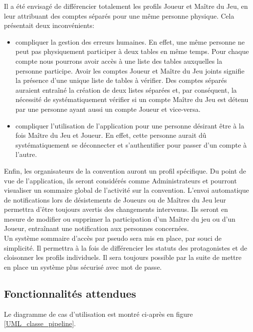 \documentclass[11pt]{article}
\begin{document}
\indent Il a été envisagé de différencier totalement les profils Joueur et Maître du Jeu, en leur attribuant des comptes séparés pour une même personne physique. Cela présentait deux inconvénients:
\begin{itemize}
\item{compliquer la gestion des erreurs humaines. En effet, une même personne ne peut pas physiquement participer à deux tables en même temps. Pour chaque compte nous pourrons avoir accès à une liste des tables auxquelles la personne participe. Avoir les comptes Joueur et Maître du Jeu joints signifie la présence d'une unique liste de tables à vérifier. Des comptes séparés auraient entraîné la création de deux listes séparées et, par conséquent, la nécessité de systématiquement vérifier si un compte Maître du Jeu est détenu par une personne ayant aussi un compte Joueur et vice-versa.}
\item{compliquer l'utilisation de l'application pour une personne désirant être à la fois Maître du Jeu et Joueur. En effet, cette personne aurait dû systématiquement se déconnecter et s'authentifier pour passer d'un compte à l'autre.\\}
\end{itemize}

Enfin, les organisateurs de la convention auront un profil spécifique. Du point de vue de l'application, ils seront considérés comme Administrateurs et pourront visualiser un sommaire global de l'activité sur la convention. L'envoi automatique de notifications lors de désistements de Joueurs ou de Maîtres du Jeu leur permettra d'être toujours avertis des changements intervenus. Ils seront en mesure de modifier ou supprimer la participation d'un Maître du jeu ou d'un Joueur, entraînant une notification aux personnes concernées.\\

Un système sommaire d'accès par pseudo sera mis en place, par souci de simplicité. Il permettra à la fois de différencier les statuts des protagonistes et de cloisonner les profils individuels. Il sera toujours possible par la suite de mettre en place un système plus sécurisé avec mot de passe. \\



\subsection{Fonctionnalités attendues}

Le diagramme de cas d'utilisation est montré ci-après en figure \ref{UML_classe_pipeline}. \\
\end{document}

